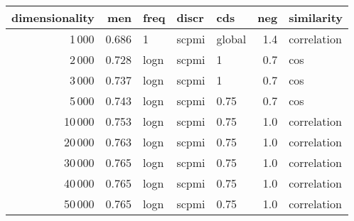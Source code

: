 \begin{tabular}{rrlllrl}
\toprule
 dimensionality &    men &  freq &  discr &     cds &  neg &   similarity \\
\midrule
           1\,000 &  0.686 &     1 &  scpmi &  global &  1.4 &  correlation \\
           2\,000 &  0.728 &  logn &  scpmi &       1 &  0.7 &          cos \\
           3\,000 &  0.737 &  logn &  scpmi &       1 &  0.7 &          cos \\
           5\,000 &  0.743 &  logn &  scpmi &    0.75 &  0.7 &          cos \\
          10\,000 &  0.753 &  logn &  scpmi &    0.75 &  1.0 &  correlation \\
          20\,000 &  0.763 &  logn &  scpmi &    0.75 &  1.0 &  correlation \\
          30\,000 &  0.765 &  logn &  scpmi &    0.75 &  1.0 &  correlation \\
          40\,000 &  0.765 &  logn &  scpmi &    0.75 &  1.0 &  correlation \\
          50\,000 &  0.765 &  logn &  scpmi &    0.75 &  1.0 &  correlation \\
\bottomrule
\end{tabular}
